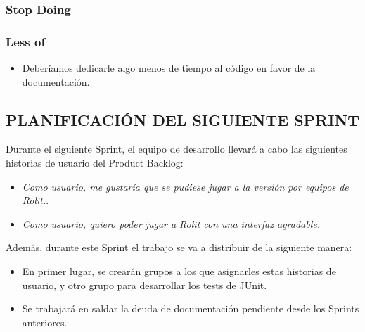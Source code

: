 \documentclass[../../SCRUM.tex]{subfiles}
\begin{document}
\subsubsection{Stop Doing}


\subsubsection{Less of}
\begin{itemize}
\item Deberíamos dedicarle algo menos de tiempo al código en favor de la documentación.
\end{itemize}

\subsection{PLANIFICACIÓN DEL SIGUIENTE SPRINT}
Durante el siguiente Sprint, el equipo de desarrollo llevará a cabo las siguientes historias de usuario del Product Backlog:
\begin{itemize}
\item \textit{Como usuario, me gustaría que se pudiese jugar a la versión por equipos de Rolit.}.
\item \textit{Como usuario, quiero poder jugar a Rolit con una interfaz agradable.}

\end{itemize}
Además, durante este Sprint el trabajo se va a distribuir de la siguiente manera:
\begin{itemize}
\item En primer lugar, se crearán grupos a los que asignarles estas historias de usuario, y otro grupo para desarrollar los tests de JUnit.
\item Se trabajará en saldar la deuda de documentación pendiente desde los Sprints anteriores.

\end{itemize}
\end{document}
